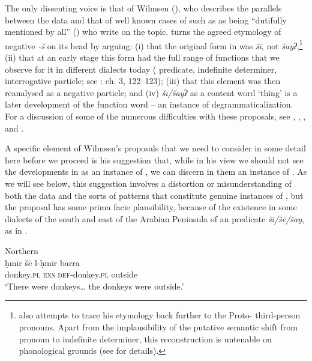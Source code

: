 \documentclass[output=paper]{langsci/langscibook}
\begin{document}
The only dissenting voice is that of Wilmsen (\citeyear{Wilmsen2013,Wilmsen2014}), who describes the parallels between the  data and that of well known cases of  such as  as being “dutifully mentioned by all” (\citeyear[117]{Wilmsen2014}) who write on the topic. \citet{Wilmsen2014} turns the agreed etymology of negative \textit{{}-š} on its head by arguing: (i) that the original form in  was \textit{šī}, not \textit{šayʔ};\footnote{\citet{Wilmsen2014} also attempts to trace his etymology back further to the Proto- third-person pronouns. Apart from the implausibility of the putative semantic shift from  pronoun to indefinite determiner, this reconstruction is untenable on phonological grounds (see \citealt{Al-Jallad2015review} for details).} (ii) that at an early stage this form had the full range of functions that we observe for it in different  dialects today ( predicate, indefinite determiner, interrogative particle; see \citealt{Wilmsen2014}: ch. 3, 122–123); (iii) that this element was then reanalysed as a negative particle; and (iv) \textit{šī/šayʔ} as a content word ‘thing’ is a later development of the function word – an instance of degrammaticalization. For a discussion of some of the numerous difficulties with these proposals, see \citet{Al-Jallad2015review}, \citet{Pat-El2016}, \citet{Souag2016review}, and \citet{Lucas2018}.

A specific element of Wilmsen’s proposals that we need to consider in some detail here before we proceed is his suggestion that, while in his view we should not see the developments in  as an instance of , we can discern in them an instance of . As we will see below, this suggestion involves a distortion or misunderstanding of both the  data and the sorts of patterns that constitute genuine instances of , but the proposal has some prima facie plausibility, because of the existence in some dialects of the south and east of the Arabian Peninsula of an  predicate \textit{šī/šē/šay}, as in .


\ea\label{oma}
{       {Northern}   \citep[92]{Eades2009}}\\
\gll ḥmīr šē l-ḥmīr barra\\
     donkey.\textsc{pl} \textsc{exs} \textsc{def-}donkey.\textsc{pl} outside\\
\glt ‘There were donkeys… the donkeys were outside.’
\z
\end{document}
